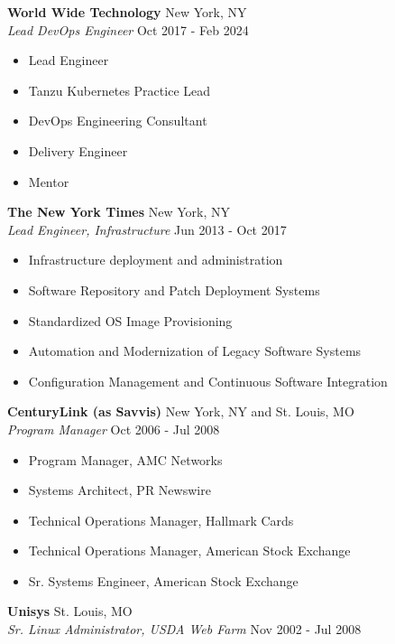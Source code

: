 \documentclass[a4paper]{article}
\begin{document}
\textbf{World Wide Technology} \hfill New York, NY\\
\textit{Lead DevOps Engineer} \hfill Oct 2017 - Feb 2024\\
\vspace{-1mm}
\begin{itemize} \itemsep 1pt
	\item Lead Engineer
	\item Tanzu Kubernetes Practice Lead
	\item DevOps Engineering Consultant
	\item Delivery Engineer
	\item Mentor
\end{itemize}
\textbf{The New York Times} \hfill New York, NY\\
\textit{Lead Engineer, Infrastructure} \hfill Jun 2013 - Oct 2017\\
\vspace{-1mm}
\begin{itemize} \itemsep 1pt
	\item Infrastructure deployment and administration
	\item Software Repository and Patch Deployment Systems
	\item Standardized OS Image Provisioning
	\item Automation and Modernization of Legacy Software Systems
	\item Configuration Management and Continuous Software Integration
\end{itemize}
\textbf{CenturyLink (as Savvis)} \hfill New York, NY and St. Louis, MO\\
\textit{Program Manager} \hfill Oct 2006 - Jul 2008\\
\vspace{-1mm}
\begin{itemize} \itemsep 1pt
	\item Program Manager, AMC Networks
	\item Systems Architect, PR Newswire
	\item Technical Operations Manager, Hallmark Cards
	\item Technical Operations Manager, American Stock Exchange
	\item Sr. Systems Engineer, American Stock Exchange
\end{itemize}
\textbf{Unisys} \hfill St. Louis, MO\\
\textit{Sr. Linux Administrator, USDA Web Farm} \hfill Nov 2002 - Jul 2008\\
\vspace{-1mm}
\end{document}
